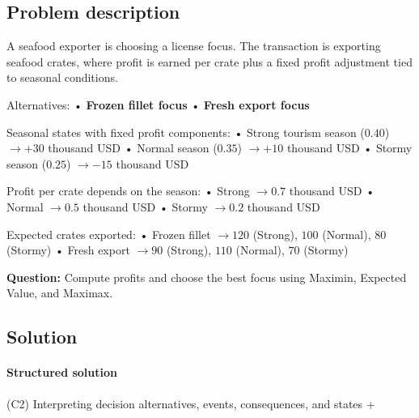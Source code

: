 \documentclass[11pt]{article}
\begin{document}
	
	\subsection*{Problem description}
	
	\hypertarget{problem11-problem}{}
	
	A seafood exporter is choosing a license focus. The transaction is exporting seafood crates, where profit is earned per
	crate plus a fixed profit adjustment tied to seasonal conditions.
	
	
	
	
	
	
	Alternatives:
	• \textbf{Frozen fillet focus}
	• \textbf{Fresh export focus}
	
	
	
	
	Seasonal states with fixed profit components:
	• Strong tourism season ($0.40$) $\to +30$ thousand USD
	• Normal season ($0.35$) $\to +10$ thousand USD
	• Stormy season ($0.25$) $\to -15$ thousand USD
	
	
	
	
	
	
	Profit per crate depends on the season:
	• Strong $\to 0.7$ thousand USD
	• Normal $\to 0.5$ thousand USD
	• Stormy $\to 0.2$ thousand USD
	
	
	
	
	
	
	Expected crates exported:
	• Frozen fillet $\to 120$ (Strong), $100$ (Normal), $80$ (Stormy)
	• Fresh export $\to 90$ (Strong), $110$ (Normal), $70$ (Stormy)
	
	
	
	
	
	\textbf{Question:} Compute profits and choose the best focus using Maximin, Expected Value, and Maximax.
	
	\subsection*{Solution}
	
	\hypertarget{problem11-solution}{}
	
	\paragraph{Structured solution}
	
	
	(C2) Interpreting decision alternatives, events, consequences, and states
	+
	
\end{document}
